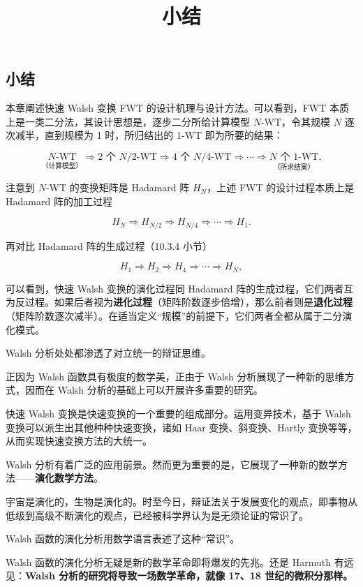 \documentclass[
  10pt,
  fontset=fandol]{ctexart}
\title{小结}
\author{}
\date{}
\begin{document}
\maketitle

\subsection{小结}\label{ux5c0fux7ed3}

本章阐述快速 Walsh 变换 FWT 的设计机理与设计方法。可以看到，FWT 本质上是一类二分法，其设计思想是，逐步二分所给计算模型 \(N\)-WT，令其规模 \(N\) 逐次减半，直到规模为 1 时，所归结出的 1-WT 即为所要的结果：

\[
\underset{\text{（计算模型）}}{N\text{-WT}}\Rightarrow2\text{ 个 }N/2\text{-WT}\Rightarrow4\text{ 个 }N/4\text{-WT}\Rightarrow\cdots\Rightarrow\underset{\text{（所求结果）}}{N\text{ 个 }1\text{-WT}}.
\]

注意到 \(N\)-WT 的变换矩阵是 Hadamard 阵 \(H_N\)，上述 FWT 的设计过程本质上是 Hadamard 阵的加工过程

\[
H_N\Rightarrow H_{N/2}\Rightarrow H_{N/4}\Rightarrow\cdots\Rightarrow H_1.
\]

再对比 Hadamard 阵的生成过程（10.3.4 小节）

\[
H_1\Rightarrow H_2\Rightarrow H_4\Rightarrow\cdots\Rightarrow H_N,
\]

可以看到，快速 Walsh 变换的演化过程同 Hadamard 阵的生成过程，它们两者互为反过程。如果后者视为\textbf{进化过程}（矩阵阶数逐步倍增），那么前者则是\textbf{退化过程}（矩阵阶数逐次减半）。在适当定义``规模''的前提下，它们两者全都从属于二分演化模式。

Walsh 分析处处都渗透了对立统一的辩证思维。

正因为 Walsh 函数具有极度的数学美，正由于 Walsh 分析展现了一种新的思维方式，因而在 Walsh 分析的基础上可以开展许多重要的研究。

快速 Walsh 变换是快速变换的一个重要的组成部分。运用变异技术，基于 Walsh 变换可以派生出其他种种快速变换，诸如 Haar 变换、斜变换、Hartly 变换等等，从而实现快速变换方法的大统一。

Walsh 分析有着广泛的应用前景。然而更为重要的是，它展现了一种新的数学方法------\textbf{演化数学方法}。

宇宙是演化的，生物是演化的。时至今日，辩证法关于发展变化的观点，即事物从低级到高级不断演化的观点，已经被科学界认为是无须论证的常识了。

Walsh 函数的演化分析用数学语言表述了这种``常识''。

Walsh 函数的演化分析无疑是新的数学革命即将爆发的先兆。还是 Harmuth 有远见：\textbf{Walsh 分析的研究将导致一场数学革命，就像 17、18 世纪的微积分那样。}
\end{document}
